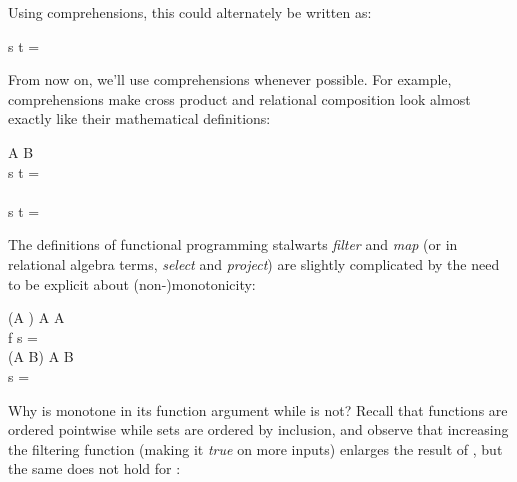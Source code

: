 \noindent
Using comprehensions, this could alternately be written as:

\begin{code}
  \mvar s \cap \mvar t =
\end{code}

\noindent From now on, we'll use comprehensions whenever possible. For example, comprehensions make cross product and relational composition look almost exactly like their mathematical definitions:

\begin{code}
  \pwild \x \pwild \isa \tseteq A \to \tseteq B \to {}\\
  \mvar s \x \mvar t =
  \\[\betweenfunctionskip]
  \pwild \compose \pwild \isa
  \to {}
  \to {}\\
  \mvar s \compose \mvar t = 
\end{code}

\noindent
The definitions of functional programming stalwarts \emph{filter} and \emph{map}
(or in relational algebra terms, \emph{select} and \emph{project}) are slightly
complicated by the need to be explicit about
(non-\nolinebreak[4])\linebreak[0]monotonicity:

\newcommand{\kernf}{\kern1.67pt f}
\newcommand{\kernfpost}{\kern.3pt}
\renewcommand{\kernf}{f}
\renewcommand{\kernfpost}{\kern.4pt}

\begin{code}
   \isa (\iso \eqt A \to \tbool) \to \tseteq A \to \tseteq A\\
   \<\mvar f \<\mvar s =
  \\[\betweenfunctionskip]
   \isa \iso(\iso \eqt A \to \eqt B) \to \tseteq A \to \tseteq B\\
   \<\pboxvar{\kernf\kernfpost} \<\mvar s = \esetfor{\dvar{\kernf}\<\ebox{\dvar x}}{\dvar x \in \mvar s}
\end{code}

\noindent
Why is  monotone in its function argument while  is not? Recall that functions are ordered pointwise while sets are ordered by inclusion, and observe that increasing the filtering function (making it \emph{true} on more inputs) enlarges the result of , but the same does not hold for : 

